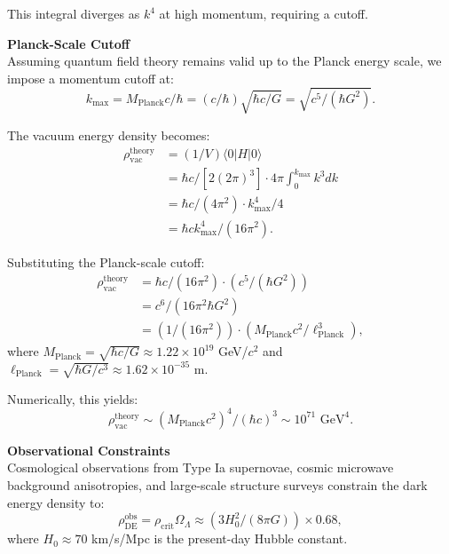\begin{technical}
This integral diverges as $k^4$ at high momentum, requiring a cutoff.

\medskip

\noindent\textbf{Planck-Scale Cutoff}\\
Assuming quantum field theory remains valid up to the Planck energy scale, we impose a momentum cutoff at:
\begin{equation}
k_{\max} = M_{\text{Planck}} c/\hbar = (c/\hbar)\sqrt{\hbar c/G} = \sqrt{c^5/(\hbar G^2)}.
\end{equation}

The vacuum energy density becomes:
\begin{align}
\rho_{\text{vac}}^{\text{theory}} &= (1/V)\langle 0 | H | 0 \rangle \\
&= \hbar c/[2(2\pi)^3] \cdot 4\pi \int_0^{k_{\max}} k^3 dk \\
&= \hbar c/(4\pi^2) \cdot k_{\max}^4/4 \\
&= \hbar c k_{\max}^4/(16\pi^2).
\end{align}

Substituting the Planck-scale cutoff:
\begin{align}
\rho_{\text{vac}}^{\text{theory}} &= \hbar c/(16\pi^2) \cdot (c^5/(\hbar G^2)) \\
&= c^6/(16\pi^2 \hbar G^2) \\
&= (1/(16\pi^2)) \cdot (M_{\text{Planck}} c^2/\ell_{\text{Planck}}^3),
\end{align}
where $M_{\text{Planck}} = \sqrt{\hbar c/G} \approx 1.22 \times 10^{19}$ GeV/$c^2$ and $\ell_{\text{Planck}} = \sqrt{\hbar G/c^3} \approx 1.62 \times 10^{-35}$ m.

Numerically, this yields:
\begin{equation}
\rho_{\text{vac}}^{\text{theory}} \sim (M_{\text{Planck}} c^2)^4/(\hbar c)^3 \sim 10^{71} \text{ GeV}^4.
\end{equation}

\medskip

\noindent\textbf{Observational Constraints}\\
Cosmological observations from Type Ia supernovae, cosmic microwave background anisotropies, and large-scale structure surveys constrain the dark energy density to:
\begin{equation}
\rho_{\text{DE}}^{\text{obs}} = \rho_{\text{crit}} \Omega_\Lambda \approx (3H_0^2/(8\pi G)) \times 0.68,
\end{equation}
where $H_0 \approx 70$ km/s/Mpc is the present-day Hubble constant.


\end{technical}
